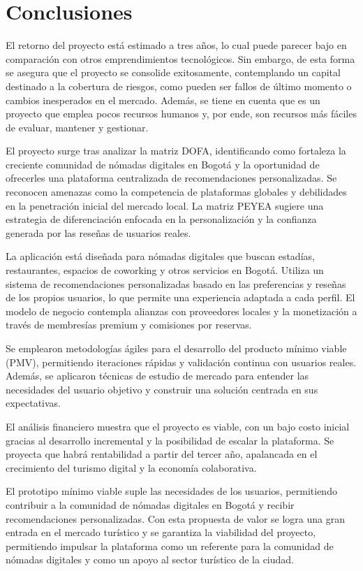\section{Conclusiones}

El retorno del proyecto está estimado a tres años, lo cual puede parecer bajo en comparación con otros emprendimientos tecnológicos. Sin embargo, de esta forma se asegura que el proyecto se consolide exitosamente, contemplando un capital destinado a la cobertura de riesgos, como pueden ser fallos de último momento o cambios inesperados en el mercado. Además, se tiene en cuenta que es un proyecto que emplea pocos recursos humanos y, por ende, son recursos más fáciles de evaluar, mantener y gestionar.

El proyecto surge tras analizar la matriz DOFA, identificando como fortaleza la creciente comunidad de nómadas digitales en Bogotá y la oportunidad de ofrecerles una plataforma centralizada de recomendaciones personalizadas. Se reconocen amenazas como la competencia de plataformas globales y debilidades en la penetración inicial del mercado local. La matriz PEYEA sugiere una estrategia de diferenciación enfocada en la personalización y la confianza generada por las reseñas de usuarios reales.

La aplicación está diseñada para nómadas digitales que buscan estadías, restaurantes, espacios de coworking y otros servicios en Bogotá. Utiliza un sistema de recomendaciones personalizadas basado en las preferencias y reseñas de los propios usuarios, lo que permite una experiencia adaptada a cada perfil. El modelo de negocio contempla alianzas con proveedores locales y la monetización a través de membresías premium y comisiones por reservas.

Se emplearon metodologías ágiles para el desarrollo del producto mínimo viable (PMV), permitiendo iteraciones rápidas y validación continua con usuarios reales. Además, se aplicaron técnicas de estudio de mercado para entender las necesidades del usuario objetivo y construir una solución centrada en sus expectativas.

El análisis financiero muestra que el proyecto es viable, con un bajo costo inicial gracias al desarrollo incremental y la posibilidad de escalar la plataforma. Se proyecta que habrá rentabilidad a partir del tercer año, apalancada en el crecimiento del turismo digital y la economía colaborativa.

El prototipo mínimo viable suple las necesidades de los usuarios, permitiendo contribuir a la comunidad de nómadas digitales en Bogotá y recibir recomendaciones personalizadas. Con esta propuesta de valor se logra una gran entrada en el mercado turístico y se garantiza la viabilidad del proyecto, permitiendo impulsar la plataforma como un referente para la comunidad de nómadas digitales y como un apoyo al sector turístico de la ciudad.
